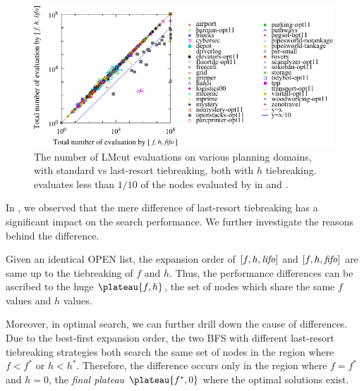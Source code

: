 \begin{figure}[htbp]
 \centering {}
 \includegraphics{tables/aaai16-30min-5min-cut/aaai16prelim3/evaluated-lmcut_ff-lmcut_lf.pdf}
 \caption{The number of LMcut evaluations on various planning domains,
 with standard \fifo vs \lifo last-resort tiebreaking, both with $h$
 tiebreaking. \lifo evaluates  less than $1/10$ of the nodes evaluated
 by \fifo in  and . 
 }
 \label{fig:f-h-eval}
\end{figure}

In , we observed that the mere difference of
last-resort tiebreaking has a significant impact on the search
performance. We further investigate the reasons behind the difference.

Given an identical OPEN list, the expansion order of $[f,h,{\mbox{\textit{lifo}}}]$ and
$[f,h,{\mbox{\textit{fifo}}}]$ are same up to the tiebreaking of $f$ and $h$. Thus, the
performance differences can be ascribed to the huge $\plateau{f,h}$, the
set of nodes which share the same $f$ values and $h$ values.


Moreover, in optimal search, we can further drill down the cause of
differences.  Due to the best-first expansion order, the two BFS with
different last-resort tiebreaking strategies both search the same set of
nodes in the region where $f<f^*$ or $h<h^*$. Therefore, the difference
occurs only in the region where $f=f^*$ and $h=0$, the \emph{final
plateau} $\plateau{f^*,0}$ where the optimal solutions exist.

